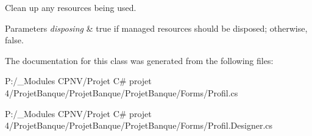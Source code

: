 Clean up any resources being used. 


\begin{DoxyParams}{Parameters}
{\em disposing} & true if managed resources should be disposed; otherwise, false.\\
\hline
\end{DoxyParams}


The documentation for this class was generated from the following files\+:\begin{DoxyCompactItemize}
\item 
P\+:/\+\_\+\+Modules C\+P\+N\+V/\+Projet C\# projet 4/\+Projet\+Banque/\+Projet\+Banque/\+Projet\+Banque/\+Forms/Profil.\+cs\item 
P\+:/\+\_\+\+Modules C\+P\+N\+V/\+Projet C\# projet 4/\+Projet\+Banque/\+Projet\+Banque/\+Projet\+Banque/\+Forms/Profil.\+Designer.\+cs\end{DoxyCompactItemize}
